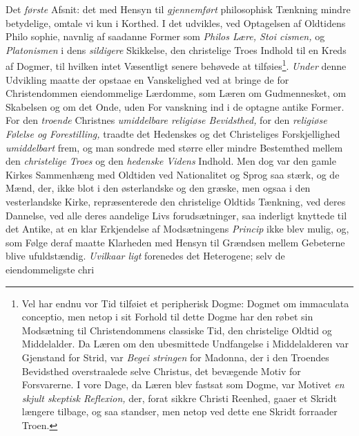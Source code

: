Det \emph{første} Afsnit: det med Hensyn til \emph{gjennemført}
philosophisk Tænkning mindre betydelige, omtale vi kun i
Korthed. I det udvikles, ved Optagelsen af Oldtidens Philo\-%
sophie, navnlig af saadanne Former som \emph{Philos Lære, Stoi\-%
cismen,} og \emph{Platonismen} i dens \emph{sildigere} Skikkelse, den
christelige Troes Indhold til en Kreds af Dogmer, til hvilken
intet Væsentligt senere behøvede at tilføies\footnote{Vel har endnu vor Tid tilføiet et peripherisk Dogme: Dogmet om
immaculata conceptio, men netop i sit Forhold til dette Dogme har
den røbet sin Modsætning til Christendommens classiske Tid, den
christelige Oldtid og Middelalder. Da Læren om den ubesmittede
Undfangelse i Middelalderen var Gjenstand for Strid, var \emph{Begei\-%
stringen} for Madonna, der i den Troendes Bevidsthed overstraalede
selve Christus, det bevægende Motiv for Forsvarerne. I vore Dage,
da Læren blev fastsat som Dogme, var Motivet \emph{en skjult skeptisk
Reflexion,} der, forat sikkre Christi Reenhed, gaaer et Skridt
længere tilbage, og saa standser, men netop ved dette ene Skridt
forraader Troen.}. \emph{Under} denne
Udvikling maatte der opstaae en Vanskelighed ved at bringe
de for Christendommen eiendommelige Lærdomme, som Læren
om Gudmennesket, om Skabelsen og om det Onde, uden For\-%
vanskning ind i de optagne antike Former. For den \emph{troende}
Christnes \emph{umiddelbare religiøse Bevidsthed,} for den
\emph{religiøse Følelse og Forestilling,} traadte det Hedenskes
og det Christeliges Forskjellighed \emph{umiddelbart} frem, og
man sondrede med større eller mindre Bestemthed mellem
den \emph{christelige Troes} og den \emph{hedenske Videns} Indhold.
Men dog var den gamle Kirkes Sammenhæng med Oldtiden
ved Nationalitet og Sprog saa stærk, og de Mænd, der, ikke
blot i den østerlandske og den græske, men ogsaa i den
vesterlandske Kirke, repræsenterede den christelige Oldtids
Tænkning, ved deres Dannelse, ved alle deres aandelige Livs\-%
forudsætninger, saa inderligt knyttede til det Antike, at en
klar Erkjendelse af Modsætningens \emph{Princip} ikke blev mulig,
og, som Følge deraf maatte Klarheden med Hensyn til
Grændsen mellem Gebeterne blive ufuldstændig. \emph{Uvilkaar\-%
ligt} forenedes det Heterogene; selv de eiendommeligste chri\-%
